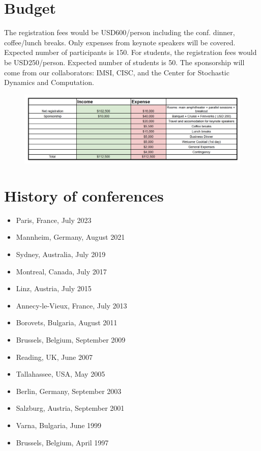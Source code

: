 \documentclass{article}
\newcommand{\ny}[1]{{\color{brown}Yiou: #1}}
\begin{document}


\section{Budget}
The registration fees would be USD600/person including the conf. dinner, coffee/lunch breaks. Only expenses from keynote speakers will be covered. Expected number of participants is 150. For students, the registration fees would be USD250/person. Expected number of students is 50. The sponsorship will come from our collaborators: IMSI, CISC, and the Center for Stochastic Dynamics and Computation.






\begin{figure}[h]
    \centering
    \includegraphics[width =.95\textwidth]{budgetv4.png}
\end{figure}


\section{History of conferences}
\begin{itemize}
\item Paris, France, July 2023
\item  Mannheim, Germany, August 2021
\item Sydney, Australia, July 2019
\item Montreal, Canada, July 2017
\item  Linz, Austria, July 2015
\item  Annecy-le-Vieux, France, July 2013
\item  Borovets, Bulgaria, August 2011
\item  Brussels, Belgium, September 2009
\item  Reading, UK, June 2007
\item  Tallahassee, USA, May 2005
\item  Berlin, Germany, September 2003
\item  Salzburg, Austria, September 2001
\item  Varna, Bulgaria, June 1999
\item  Brussels, Belgium, April 1997
\end{itemize}
\end{document}
